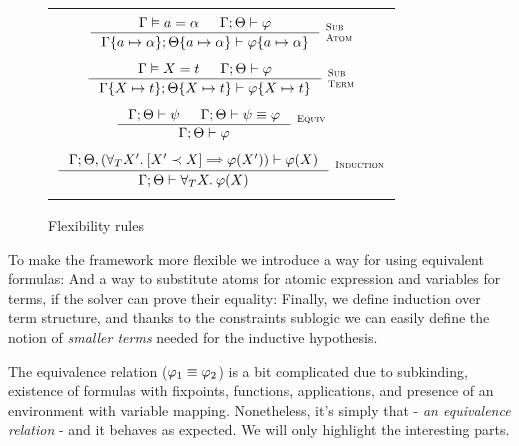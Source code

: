 \documentclass[english, mgr]{iithesis}
\renewcommand{\it}[1]{\textit{#1}}
\newcommand{\scbrk}[2]{\myatop{\textsc{#1}}{\textsc{#2}}}
\begin{document}
\begin{figure}[htbp]
\centering
\begin{tabularx}{\textwidth}{|C|}
  \hline \\
$
  \inference{
    \cjgmnt[\cEnv]{\atomv \ceq \atomexp} &
    \jgmnt[\cEnv;\Theta]{\formphi}
    }{
    \jgmnt[\cEnv\{\atomv \mapsto \atomexp\};\Theta\{\atomv \mapsto \atomexp\}]{\formphi\{\atomv \mapsto \atomexp\}}
  }\:\scbrk{Sub}{Atom}
$ \\ \\ $
  \inference{
    \cjgmnt[\cEnv]{\termv \ceq \term} &
    \jgmnt[\cEnv;\Theta]{\formphi}
    }{
    \jgmnt[\cEnv\{\termv \mapsto \term\};\Theta\{\termv \mapsto \term\}]{\formphi\{\termv \mapsto \term\}}
  }\:\scbrk{Sub}{Term}
$ \\ \\ $
  \inference{
    \jgmnt[\cEnv;\Theta]{\psi} &
    \jgmnt[\cEnv;\Theta]{\psi \equiv \formphi}
    }{
    \jgmnt[\cEnv;\Theta]{\formphi}
  }\:\scbrk{Equiv}{}
$ \\ \\ $
  \inference{
    \jgmnt[\cEnv;\Theta, (\fForallTerm{\termv'} \fCImp{\termv' \cshlt \termv} \formphi(\termv'))]{\formphi(\termv)}
    }{
    \jgmnt[\cEnv;\Theta]{\fForallTerm{\termv} \formphi(\termv)}
  }\:\scbrk{Induction}{}
  $ \\ \\ \hline
\end{tabularx}
\caption{Flexibility rules}
\label{fig:flexibility}
\end{figure}
To make the framework more flexible we introduce a way for using equivalent formulas:
And a way to substitute atoms for atomic expression and variables for terms, if the solver can prove their equality:
Finally, we define induction over term structure,
and thanks to the constraints sublogic we can easily define the notion of
\it{smaller terms} needed for the inductive hypothesis.

The equivalence relation ($\varphi_1 \equiv \varphi_2$) is a bit complicated
due to subkinding, existence of formulas
with fixpoints, functions, applications,
and presence of an environment with variable mapping.
Nonetheless, it's simply that - \it{an equivalence relation} - and it
behaves as expected. We will only highlight the interesting parts.
\end{document}
